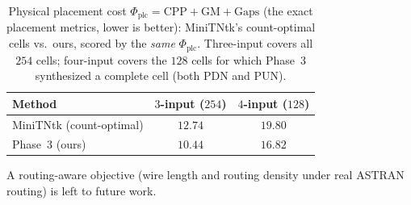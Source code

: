 \begin{table}[t]
\centering
\caption{Physical placement cost
         $\Phi_{\mathrm{plc}} = \mathrm{CPP}+\mathrm{GM}+\mathrm{Gaps}$ (the
         exact placement metrics, lower is better): MiniTNtk's count-optimal
         cells vs.\ ours, scored by the \emph{same} $\Phi_{\mathrm{plc}}$.
         Three-input covers all $254$ cells; four-input covers the $128$ cells
         for which Phase~3 synthesized a complete cell (both PDN and PUN).}
\label{tab:physical}
\begin{tabular}{lcc}
\toprule
\textbf{Method} & \textbf{$3$-input ($254$)} & \textbf{$4$-input ($128$)} \\
\midrule
MiniTNtk (count-optimal) & $12.74$          & $19.80$ \\
\method{} Phase~3 (ours) & $\mathbf{10.44}$ & $\mathbf{16.82}$ \\
\bottomrule
\end{tabular}
\end{table}

A routing-aware objective (wire length and routing density under real ASTRAN
routing) is left to future work.

